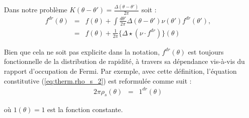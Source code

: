 Dans notre problème $K ( \theta - \theta' ) = \frac{\Delta ( \theta - \theta') }{ 2 \pi } $ soit : 
\begin{eqnarray}
	f^{dr}(\theta) & = & f(\theta) + \int \frac{ d \theta '}{2\pi}  \Delta ( \theta - \theta' ) \nu ( \theta' ) f^{dr}(\theta'),\\
	& = & 	f(\theta) + \frac{1}{2 \pi} \{ \Delta  \star (\nu \cdot f^{dr}) \} ( \theta ) 	 		
\end{eqnarray}

Bien que cela ne soit pas explicite dans la notation, $f^{dr}(\theta)$ est toujours fonctionnelle de la distribution de rapidité, à travers sa dépendance vis-à-vis du rapport d'occupation de Fermi. Par exemple, avec cette définition, l'équation constitutive (\ref{eq:therm.rho_s_2}) est reformulée comme suit :
\begin{eqnarray}
	2\pi \rho_s ( \theta ) & = & \mathrm{1}^{dr}(\theta)		
\end{eqnarray}

où $\mathrm{1}(\theta) = 1$ est la fonction constante.







